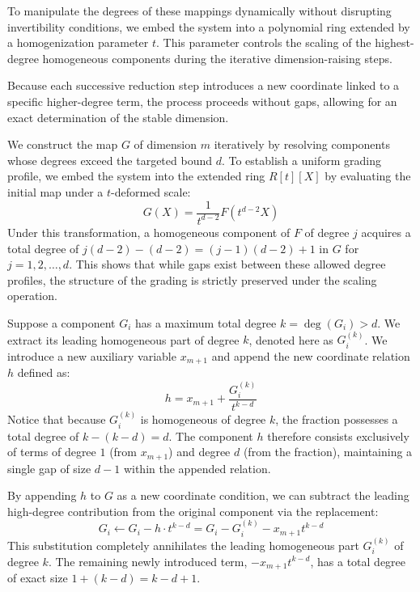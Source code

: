 \documentclass[11pt,a4paper]{article}
\begin{document}
To manipulate the degrees of these mappings dynamically without disrupting invertibility conditions, we embed the system into a polynomial ring extended by a homogenization parameter $t$. This parameter controls the scaling of the highest-degree homogeneous components during the iterative dimension-raising steps.

Because each successive reduction step introduces a new coordinate linked to a specific higher-degree term, the process proceeds without gaps, allowing for an exact determination of the stable dimension.

We construct the map $G$ of dimension $m$ iteratively by resolving components whose degrees exceed the targeted bound $d$. To establish a uniform grading profile, we embed the system into the extended ring $R[t][X]$ by evaluating the initial map under a $t$-deformed scale:
\begin{equation}
G(X) = \frac{1}{t^{d-2}}F(t^{d-2}X)
\end{equation}
Under this transformation, a homogeneous component of $F$ of degree $j$ acquires a total degree of $j(d-2) - (d-2) = (j-1)(d-2) + 1$ in $G$ for $j = 1, 2, \ldots, d$. This shows that while gaps exist between these allowed degree profiles, the structure of the grading is strictly preserved under the scaling operation.

Suppose a component $G_i$ has a maximum total degree $k = \deg(G_i) > d$. We extract its leading homogeneous part of degree $k$, denoted here as $G_{i}^{(k)}$. We introduce a new auxiliary variable $x_{m+1}$ and append the new coordinate relation $h$ defined as:
\begin{equation}
h = x_{m+1} + \frac{G_{i}^{(k)}}{t^{k-d}}
\end{equation}
Notice that because $G_{i}^{(k)}$ is homogeneous of degree $k$, the fraction possesses a total degree of $k - (k-d) = d$. The component $h$ therefore consists exclusively of terms of degree $1$ (from $x_{m+1}$) and degree $d$ (from the fraction), maintaining a single gap of size $d-1$ within the appended relation.

By appending $h$ to $G$ as a new coordinate condition, we can subtract the leading high-degree contribution from the original component via the replacement:
\begin{equation}
G_i \leftarrow G_i - h \cdot t^{k-d} = G_i - G_{i}^{(k)} - x_{m+1} t^{k-d}
\end{equation}
This substitution completely annihilates the leading homogeneous part $G_{i}^{(k)}$ of degree $k$. The remaining newly introduced term, $-x_{m+1} t^{k-d}$, has a total degree of exact size $1 + (k-d) = k - d + 1$. 
\end{document}
